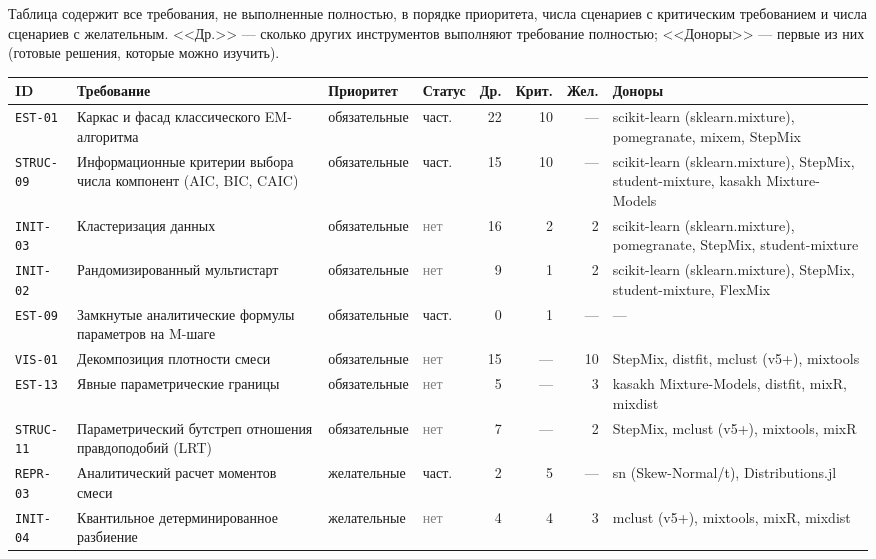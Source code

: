 \documentclass[10pt,a4paper]{article}
\begin{document}
\begin{landscape}
Таблица содержит все требования, не выполненные полностью, в порядке приоритета, числа сценариев с критическим требованием и числа сценариев с желательным.
<<Др.>> --- сколько других инструментов выполняют требование полностью; <<Доноры>> --- первые из них (готовые решения, которые можно изучить).
{\scriptsize\setlength{\tabcolsep}{3pt}
\begin{longtable}{@{}l >{\raggedright\arraybackslash}p{8.2cm} l l r r r >{\raggedright\arraybackslash}p{6.2cm}@{}}
\toprule
ID & Требование & Приоритет & Статус & Др. & Крит. & Жел. & Доноры \\
\midrule
\endhead
\texttt{EST-01} & Каркас и фасад классического EM-алгоритма & обязательные & \cellcolor{part!40}част. & 22 & 10 & --- & scikit-learn (sklearn.mixture), pomegranate, mixem, StepMix \\
\texttt{STRUC-09} & Информационные критерии выбора числа компонент (AIC, BIC, CAIC) & обязательные & \cellcolor{part!40}част. & 15 & 10 & --- & scikit-learn (sklearn.mixture), StepMix, student-mixture, kasakh Mixture-Models \\
\texttt{INIT-03} & Кластеризация данных & обязательные & \textcolor{gray}{нет} & 16 & 2 & 2 & scikit-learn (sklearn.mixture), pomegranate, StepMix, student-mixture \\
\texttt{INIT-02} & Рандомизированный мультистарт & обязательные & \textcolor{gray}{нет} & 9 & 1 & 2 & scikit-learn (sklearn.mixture), StepMix, student-mixture, FlexMix \\
\texttt{EST-09} & Замкнутые аналитические формулы параметров на M-шаге & обязательные & \cellcolor{part!40}част. & 0 & 1 & --- & --- \\
\texttt{VIS-01} & Декомпозиция плотности смеси & обязательные & \textcolor{gray}{нет} & 15 & --- & 10 & StepMix, distfit, mclust (v5+), mixtools \\
\texttt{EST-13} & Явные параметрические границы & обязательные & \textcolor{gray}{нет} & 5 & --- & 3 & kasakh Mixture-Models, distfit, mixR, mixdist \\
\texttt{STRUC-11} & Параметрический бутстреп отношения правдоподобий (LRT) & обязательные & \textcolor{gray}{нет} & 7 & --- & 2 & StepMix, mclust (v5+), mixtools, mixR \\
\texttt{REPR-03} & Аналитический расчет моментов смеси & желательные & \cellcolor{part!40}част. & 2 & 5 & --- & sn (Skew-Normal/t), Distributions.jl \\
\texttt{INIT-04} & Квантильное детерминированное разбиение & желательные & \textcolor{gray}{нет} & 4 & 4 & 3 & mclust (v5+), mixtools, mixR, mixdist \\

\end{longtable}}
\end{landscape}
\end{document}

